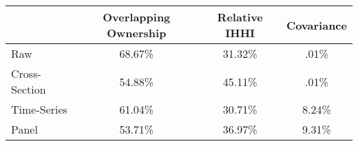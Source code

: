 {
\def\sym#1{\ifmmode^{#1}\else\(^{#1}\)\fi}
\begin{tabular}{l*{3}{c}}
\hline\hline
                    &\multicolumn{1}{c}{Overlapping Ownership}       &\multicolumn{1}{c}{Relative IHHI}       &\multicolumn{1}{c}{Covariance}       \\
\hline
Raw & 68.67\% & 31.32\% & .01\%\\
Cross-Section & 54.88\% &45.11\% & .01\% \\
Time-Series & 61.04\% & 30.71\% & 8.24\% \\
Panel & 53.71\% & 36.97\% & 9.31\% \\
\hline\hline
\end{tabular}
}
